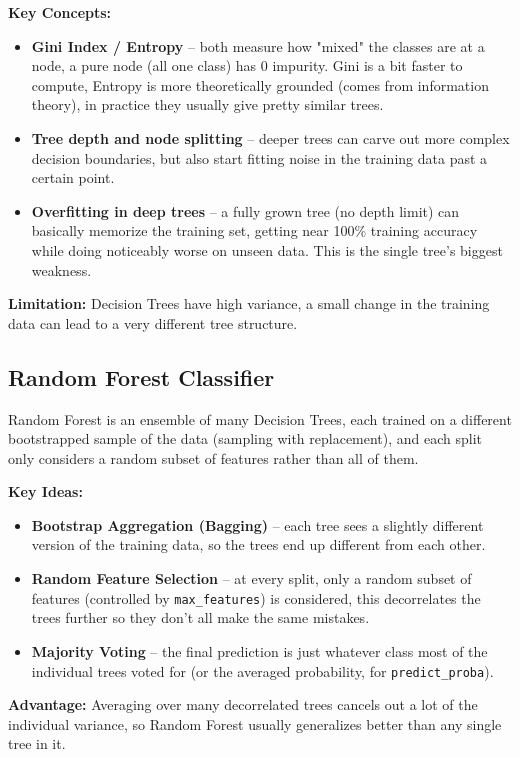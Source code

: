 \documentclass[12pt,a4paper]{article}
\begin{document}
\textbf{Key Concepts:}
\begin{itemize}
\item \textbf{Gini Index / Entropy} -- both measure how "mixed" the classes are at a node, a pure node (all one class) has 0 impurity. Gini is a bit faster to compute, Entropy is more theoretically grounded (comes from information theory), in practice they usually give pretty similar trees.
\item \textbf{Tree depth and node splitting} -- deeper trees can carve out more complex decision boundaries, but also start fitting noise in the training data past a certain point.
\item \textbf{Overfitting in deep trees} -- a fully grown tree (no depth limit) can basically memorize the training set, getting near 100\% training accuracy while doing noticeably worse on unseen data. This is the single tree's biggest weakness.
\end{itemize}
\textbf{Limitation:} Decision Trees have high variance, a small change in the training data can lead to a very different tree structure.

\subsection*{Random Forest Classifier}
Random Forest is an ensemble of many Decision Trees, each trained on a different bootstrapped sample of the data (sampling with replacement), and each split only considers a random subset of features rather than all of them.

\textbf{Key Ideas:}
\begin{itemize}
\item \textbf{Bootstrap Aggregation (Bagging)} -- each tree sees a slightly different version of the training data, so the trees end up different from each other.
\item \textbf{Random Feature Selection} -- at every split, only a random subset of features (controlled by \texttt{max\_features}) is considered, this decorrelates the trees further so they don't all make the same mistakes.
\item \textbf{Majority Voting} -- the final prediction is just whatever class most of the individual trees voted for (or the averaged probability, for \texttt{predict\_proba}).
\end{itemize}
\textbf{Advantage:} Averaging over many decorrelated trees cancels out a lot of the individual variance, so Random Forest usually generalizes better than any single tree in it.
\end{document}

